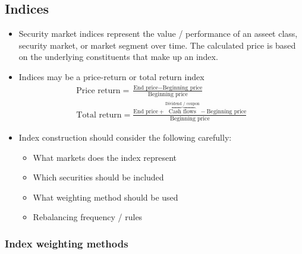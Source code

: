 \documentclass[../notes_compiled.tex]{subfiles}
\begin{document}
\subsection{Indices}

\begin{itemize}
\item Security market indices represent the value / performance of an asseet class, security market, or market segment over time. The calculated price is based on the underlying constituents that make up an index.
\item Indices may be a price-return or total return index
\begin{gather}
\text{Price return} = \frac{\text{End price} - \text{Beginning price}}{\text{Beginning price}} \\
\text{Total return} = \frac{\text{End price}+\overbrace{\text{Cash flows}}^{\text{Dividend / coupon}} - \text{Beginning price}}{\text{Beginning price}}
\end{gather}

\item Index construction should consider the following carefully:
\begin{itemize}
\item What markets does the index represent
\item Which securities should be included
\item What weighting method should be used
\item Rebalancing frequency / rules
\end{itemize}
\end{itemize}


\subsubsection{Index weighting methods}
\end{document}
